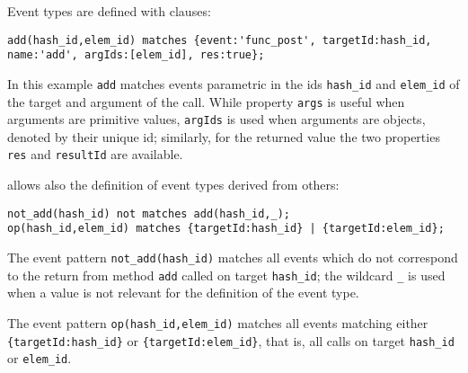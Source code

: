 Event types are defined with clauses:
\begin{lstlisting}[basicstyle=\ttfamily\scriptsize]
add(hash_id,elem_id) matches {event:'func_post', targetId:hash_id, name:'add', argIds:[elem_id], res:true};
\end{lstlisting}
In this example \lstinline{add} matches events parametric in the
ids \lstinline{hash_id} and \lstinline{elem_id} of the target and argument of the call. While property
\lstinline{args} is useful when arguments are primitive values, \lstinline{argIds} is used when arguments are objects, denoted by their unique id;
similarly, for the returned value the two properties \lstinline{res} and \lstinline{resultId} are available.




\rml allows also the definition of event types derived from others:

\begin{lstlisting}[basicstyle=\ttfamily\scriptsize]
not_add(hash_id) not matches add(hash_id,_);
op(hash_id,elem_id) matches {targetId:hash_id} | {targetId:elem_id};
\end{lstlisting}  
The event pattern \lstinline{not_add(hash_id)} matches all events which do not correspond to the return from
method \lstinline{add} called on target \lstinline{hash_id}; the wildcard \lstinline!_! is used when a value is not relevant for
the definition of the event type.

The event pattern \lstinline{op(hash_id,elem_id)} matches all events matching either \lstinline!{targetId:hash_id}! or
\lstinline!{targetId:elem_id}!, that is, all calls on target \lstinline{hash_id} or \lstinline{elem_id}.

